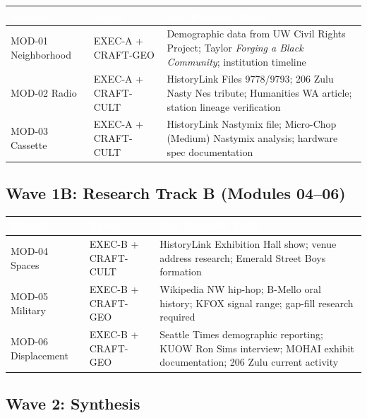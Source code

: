 \documentclass[11pt,letterpaper]{article}
\newcommand{\tableheader}[1]{\textbf{\sffamily\textcolor{white}{#1}}}
\begin{document}
\begin{center}
\begin{tabularx}{\textwidth}{L{2.5cm}L{2cm}X}
\toprule
{}
\tableheader{Module} & \tableheader{Agent} & \tableheader{Key Research Tasks} \\
\midrule
MOD-01 Neighborhood & EXEC-A + CRAFT-GEO & Demographic data from UW Civil Rights Project; Taylor \textit{Forging a Black Community}; institution timeline \\
MOD-02 Radio & EXEC-A + CRAFT-CULT & HistoryLink Files 9778/9793; 206 Zulu Nasty Nes tribute; Humanities WA article; station lineage verification \\
MOD-03 Cassette & EXEC-A + CRAFT-CULT & HistoryLink Nastymix file; Micro-Chop (Medium) Nastymix analysis; hardware spec documentation \\
\bottomrule
\end{tabularx}
\end{center}

\subsection{Wave 1B: Research Track B (Modules 04--06)}

\begin{center}
\begin{tabularx}{\textwidth}{L{2.5cm}L{2cm}X}
\toprule
{}
\tableheader{Module} & \tableheader{Agent} & \tableheader{Key Research Tasks} \\
\midrule
MOD-04 Spaces & EXEC-B + CRAFT-CULT & HistoryLink Exhibition Hall show; venue address research; Emerald Street Boys formation \\
MOD-05 Military & EXEC-B + CRAFT-GEO & Wikipedia NW hip-hop; B-Mello oral history; KFOX signal range; gap-fill research required \\
MOD-06 Displacement & EXEC-B + CRAFT-GEO & Seattle Times demographic reporting; KUOW Ron Sims interview; MOHAI exhibit documentation; 206 Zulu current activity \\
\bottomrule
\end{tabularx}
\end{center}

\subsection{Wave 2: Synthesis}
\end{document}
